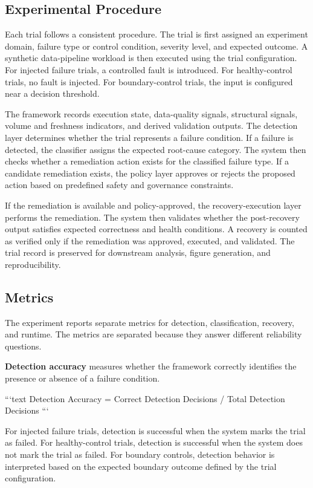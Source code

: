 \subsection{Experimental Procedure}


Each trial follows a consistent procedure. The trial is first assigned an experiment domain, failure type or control condition, severity level, and expected outcome. A synthetic data-pipeline workload is then executed using the trial configuration. For injected failure trials, a controlled fault is introduced. For healthy-control trials, no fault is injected. For boundary-control trials, the input is configured near a decision threshold.

The framework records execution state, data-quality signals, structural signals, volume and freshness indicators, and derived validation outputs. The detection layer determines whether the trial represents a failure condition. If a failure is detected, the classifier assigns the expected root-cause category. The system then checks whether a remediation action exists for the classified failure type. If a candidate remediation exists, the policy layer approves or rejects the proposed action based on predefined safety and governance constraints.

If the remediation is available and policy-approved, the recovery-execution layer performs the remediation. The system then validates whether the post-recovery output satisfies expected correctness and health conditions. A recovery is counted as verified only if the remediation was approved, executed, and validated. The trial record is preserved for downstream analysis, figure generation, and reproducibility.

\subsection{Metrics}


The experiment reports separate metrics for detection, classification, recovery, and runtime. The metrics are separated because they answer different reliability questions.

\textbf{Detection accuracy} measures whether the framework correctly identifies the presence or absence of a failure condition.

```text
Detection Accuracy = Correct Detection Decisions / Total Detection Decisions
```

For injected failure trials, detection is successful when the system marks the trial as failed. For healthy-control trials, detection is successful when the system does not mark the trial as failed. For boundary controls, detection behavior is interpreted based on the expected boundary outcome defined by the trial configuration.

